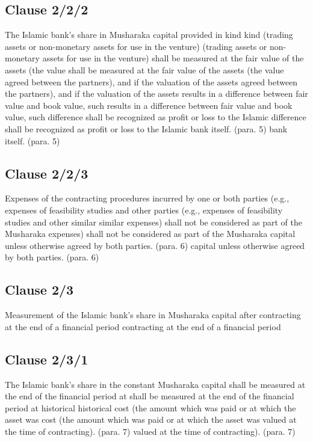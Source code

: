 \documentclass{article}%
\begin{document}
\subsection{Clause 2/2/2}%
\label{subsec:Clause2/2/2}%
The Islamic bank’s share in Musharaka capital provided in kind  kind  (trading assets or non-monetary assets for use in the venture)  (trading assets or non-monetary assets for use in the venture)  shall be measured at the fair value of the assets (the value  shall be measured at the fair value of the assets (the value  agreed between the partners), and if the valuation of the assets  agreed between the partners), and if the valuation of the assets  results in a difference between fair value and book value, such  results in a difference between fair value and book value, such  difference shall be recognized as profit or loss to the Islamic  difference shall be recognized as profit or loss to the Islamic  bank itself. (para. 5) bank itself. (para. 5)

%
\subsection{Clause 2/2/3}%
\label{subsec:Clause2/2/3}%
Expenses of the contracting procedures incurred by one or both  parties (e.g., expenses of feasibility studies and other  parties (e.g., expenses of feasibility studies and other similar  similar  expenses) shall not be considered as part of the Musharaka  expenses) shall not be considered as part of the Musharaka  capital unless otherwise agreed by both parties. (para. 6) capital unless otherwise agreed by both parties. (para. 6)

%
\subsection{Clause 2/3}%
\label{subsec:Clause2/3}%
Measurement of the Islamic bank’s share in Musharaka capital after  contracting at the end of a financial period contracting at the end of a financial period

%
\subsection{Clause 2/3/1}%
\label{subsec:Clause2/3/1}%
The Islamic bank’s share in the constant Musharaka capital  shall be measured at the end of the financial period at  shall be measured at the end of the financial period at historical  historical  cost (the amount which was paid or at which the asset was  cost (the amount which was paid or at which the asset was  valued at the time of contracting). (para. 7) valued at the time of contracting). (para. 7)
\end{document}
